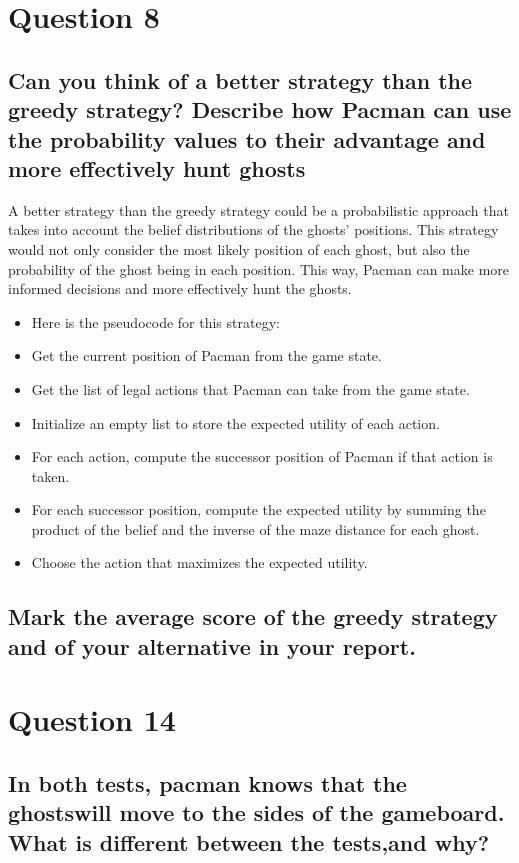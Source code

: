 \documentclass[11pt]{article}
\begin{document}
\section*{Question 8}
\subsection*{Can you think of a better strategy than the greedy strategy? Describe how Pacman can use the probability values to their advantage and more effectively hunt ghosts}
A better strategy than the greedy strategy could be a probabilistic approach that takes into account the belief distributions of the ghosts' positions.
This strategy would not only consider the most likely position of each ghost, but also the probability of the ghost being in each position.
This way, Pacman can make more informed decisions and more effectively hunt the ghosts.
\begin{itemize}
    \item Here is the pseudocode for this strategy:
    \item Get the current position of Pacman from the game state.
    \item Get the list of legal actions that Pacman can take from the game state.
    \item Initialize an empty list to store the expected utility of each action.
    \item For each action, compute the successor position of Pacman if that action is taken.
    \item For each successor position, compute the expected utility by summing the product of the belief and the inverse of the maze distance for each ghost.
    \item Choose the action that maximizes the expected utility.
\end{itemize}

\subsection*{Mark the average score of the greedy strategy and of your alternative in your report.}

\section*{Question 14}
\subsection*{In both tests, pacman knows that the ghostswill move to the sides of the gameboard. What is different between the tests,and why?}
\end{document}
